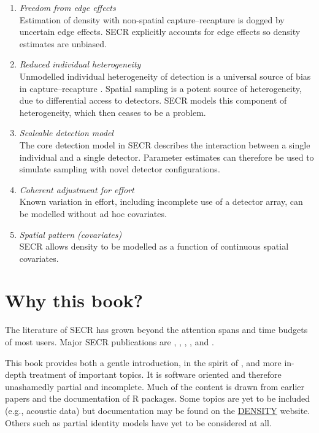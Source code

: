 \documentclass[
]{book}
\providecommand{\tightlist}{%
  \setlength{\itemsep}{0pt}\setlength{\parskip}{0pt}}
\begin{document}
\begin{enumerate}
\def\labelenumi{\arabic{enumi}.}
\tightlist
\item
  \emph{Freedom from edge effects}\\
  Estimation of density with non-spatial capture--recapture is dogged by uncertain edge effects. SECR explicitly accounts for edge effects so density estimates are unbiased.
\item
  \emph{Reduced individual heterogeneity}\\
  Unmodelled individual heterogeneity of detection is a universal source of bias in capture--recapture \citep[e.g.,][]{lc24}. Spatial sampling is a potent source of heterogeneity, due to differential access to detectors. SECR models this component of heterogeneity, which then ceases to be a problem.
\item
  \emph{Scaleable detection model}\\
  The core detection model in SECR describes the interaction between a single individual and a single detector. Parameter estimates can therefore be used to simulate sampling with novel detector configurations.
\item
  \emph{Coherent adjustment for effort}\\
  Known variation in effort, including incomplete use of a detector array, can be modelled without ad hoc covariates.
\item
  \emph{Spatial pattern (covariates)}\\
  SECR allows density to be modelled as a function of continuous spatial covariates.
\end{enumerate}

\section*{Why this book?}\label{why-this-book}

The literature of SECR has grown beyond the attention spans and time budgets of most users. Major SECR publications are \citet{e04}, \citet{be08}, \citet{rcsg14}, \citet{bf16}, \citet{srl19} and \citet{Turek2021}.

This book provides both a gentle introduction, in the spirit of \citep{cw}, and more in-depth treatment of important topics. It is software oriented and therefore unashamedly partial and incomplete. Much of the content is drawn from earlier papers and the documentation of R \citep{R-base} packages. Some topics are yet to be included (e.g., acoustic data) but documentation may be found on the \href{https://www.otago.ac.nz/density/SECRinR.html}{DENSITY} website. Others such as partial identity models \citep{Augustine2018} have yet to be considered at all.
\end{document}
